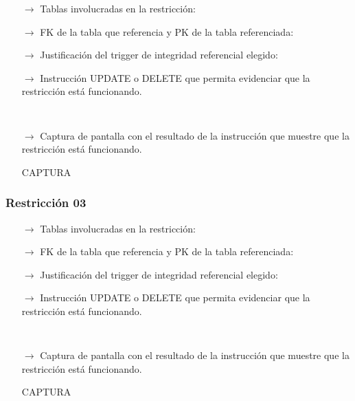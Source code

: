 \begin{itemize}
    \item[$\rightarrow$] Tablas involucradas en la restricción: 
    \item[$\rightarrow$] FK de la tabla que referencia y PK de la tabla referenciada: 
    \item[$\rightarrow$] Justificación del trigger de integridad referencial elegido: 
    \item[$\rightarrow$] Instrucción UPDATE o DELETE que permita evidenciar que la restricción está funcionando.
        \begin{verbatim}
    
        \end{verbatim}

    \item[$\rightarrow$] Captura de pantalla con el resultado de la instrucción que muestre que la restricción está funcionando.
    
        \begin{center}
            CAPTURA
        \end{center}

\end{itemize}

\subsubsection*{Restricción 03}

\begin{itemize}
    \item[$\rightarrow$] Tablas involucradas en la restricción: 
    \item[$\rightarrow$] FK de la tabla que referencia y PK de la tabla referenciada: 
    \item[$\rightarrow$] Justificación del trigger de integridad referencial elegido: 
    \item[$\rightarrow$] Instrucción UPDATE o DELETE que permita evidenciar que la restricción está funcionando.
        \begin{verbatim}
    
        \end{verbatim}

    \item[$\rightarrow$] Captura de pantalla con el resultado de la instrucción que muestre que la restricción está funcionando.
    
        \begin{center}
            CAPTURA
        \end{center}

\end{itemize}

